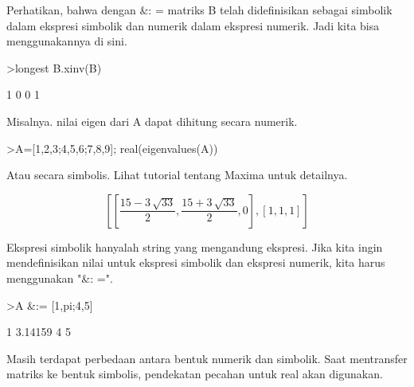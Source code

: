 \documentclass{article}
\begin{document}
\begin{eulernotebook}
\begin{eulercomment}
\begin{eulercomment}
\begin{eulercomment}
\begin{eulercomment}
\begin{eulercomment}
\begin{eulercomment}
\begin{eulercomment}
\begin{eulercomment}
\begin{eulercomment}
Perhatikan, bahwa dengan \&: = matriks B telah didefinisikan sebagai
simbolik dalam ekspresi simbolik dan numerik dalam ekspresi numerik.
Jadi kita bisa menggunakannya di sini.
\end{eulercomment}
\begin{eulerprompt}
>longest B.xinv(B)
\end{eulerprompt}
\begin{euleroutput}
                        1                       0 
                        0                       1 
\end{euleroutput}
\begin{eulercomment}
Misalnya. nilai eigen dari A dapat dihitung secara numerik.
\end{eulercomment}
\begin{eulerprompt}
>A=[1,2,3;4,5,6;7,8,9]; real(eigenvalues(A))
\end{eulerprompt}
\begin{euleroutput}
  [16.1168,  -1.11684,  0]
\end{euleroutput}
\begin{eulercomment}
Atau secara simbolis. Lihat tutorial tentang Maxima untuk detailnya.
\end{eulercomment}
\begin{eulerformula}
\[
\left[ \left[ \frac{15-3\,\sqrt{33}}{2} , \frac{15+3\,\sqrt{33}}{2}
  , 0 \right]  , \left[ 1 , 1 , 1 \right]  \right] 
\]
\end{eulerformula}
\begin{eulercomment}
Ekspresi simbolik hanyalah string yang mengandung ekspresi. Jika kita
ingin mendefinisikan nilai untuk ekspresi simbolik dan ekspresi
numerik, kita harus menggunakan "\&: =".
\end{eulercomment}
\begin{eulerprompt}
>A &:= [1,pi;4,5]
\end{eulerprompt}
\begin{euleroutput}
              1       3.14159 
              4             5 
\end{euleroutput}
\begin{eulercomment}
Masih terdapat perbedaan antara bentuk numerik dan simbolik. Saat
mentransfer matriks ke bentuk simbolis, pendekatan pecahan untuk real
akan digunakan.
\end{eulercomment}
\begin{eulerprompt}

\end{eulerprompt}
\end{eulercomment}
\end{eulercomment}
\end{eulercomment}
\end{eulercomment}
\end{eulercomment}
\end{eulercomment}
\end{eulercomment}
\end{eulercomment}
\end{eulernotebook}
\end{document}
